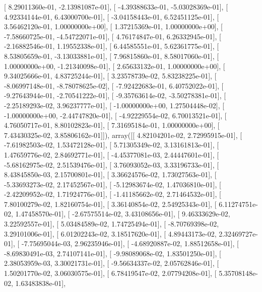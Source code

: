 \documentclass{article}
\begin{document}
       [  8.29011360e-01,  -2.13981087e-01],
       [ -4.39388633e-01,  -5.03028369e-01],
       [  4.92334144e-01,   6.43000700e-01],
       [ -3.04158443e-01,   6.52451125e-01],
       [  3.56462120e-01,   1.00000000e+00],
       [  1.37215369e-01,   1.00000000e+00],
       [ -7.58660725e-01,  -4.54722071e-01],
       [  4.76174847e-01,   6.26332945e-01],
       [ -2.16882546e-01,   1.19552338e-01],
       [  6.44585551e-01,   5.62361775e-01],
       [  8.53805659e-01,  -3.13033881e-01],
       [  7.96815860e-01,   8.58017060e-01],
       [  1.00000000e+00,  -1.21340098e-01],
       [  2.65633132e-01,   1.00000000e+00],
       [  9.34025666e-01,   4.83725244e-01],
       [  3.23578739e-02,   5.83238225e-01],
       [ -8.06997148e-01,  -8.78078625e-02],
       [ -7.92422683e-01,   6.40752022e-01],
       [ -9.27643944e-01,  -2.70541222e-01],
       [ -9.35763614e-02,  -3.50278381e-01],
       [ -2.25189293e-02,   3.96237777e-01],
       [ -1.00000000e+00,   1.27504448e-02],
       [ -1.00000000e+00,  -2.44747820e-01],
       [ -4.92229554e-02,   6.70013521e-01],
       [  4.76050717e-01,   8.80102823e-01],
       [  7.31695184e-01,   1.00000000e+00],
       [  7.43430325e-02,   3.85806162e-01]]), array([[  4.82104201e-02,   2.72995915e-01],
       [ -7.61982503e-02,   1.53472128e-01],
       [  5.71305349e-02,   3.13161813e-01],
       [  1.47659776e-02,   2.84692771e-01],
       [ -4.45377081e-03,   2.44447601e-01],
       [ -5.68162975e-02,   2.51539476e-01],
       [  3.76093052e-03,   3.33196733e-01],
       [  8.43845850e-03,   2.15700801e-01],
       [  3.36624576e-02,   1.73027563e-01],
       [ -5.33693273e-02,   2.17452567e-01],
       [ -5.12983674e-02,   1.47036810e-01],
       [ -2.42209952e-02,   1.71924776e-01],
       [ -1.41185662e-02,   2.71464532e-01],
       [  7.80100279e-02,   1.82160754e-01],
       [  3.36140854e-02,   2.54925343e-01],
       [  6.11274751e-02,   1.47458570e-01],
       [ -2.67575514e-02,   3.43108656e-01],
       [  9.46333629e-02,   3.22592557e-01],
       [  5.03484589e-02,   1.74725494e-01],
       [ -8.70769398e-02,   3.29101006e-01],
       [  6.01202243e-02,   3.18517620e-01],
       [  4.89443173e-02,   2.32469727e-01],
       [ -7.75695044e-03,   2.96235946e-01],
       [ -4.68920887e-02,   1.88512658e-01],
       [ -8.69830491e-03,   2.74107141e-01],
       [ -9.98089068e-02,   1.83501250e-01],
       [  2.38053959e-03,   3.30021731e-01],
       [ -9.56634337e-02,   2.05762846e-01],
       [  1.50201770e-02,   3.06030575e-01],
       [  6.78419547e-02,   2.07794208e-01],
       [  5.35708148e-02,   1.63483838e-01],
\end{document}
